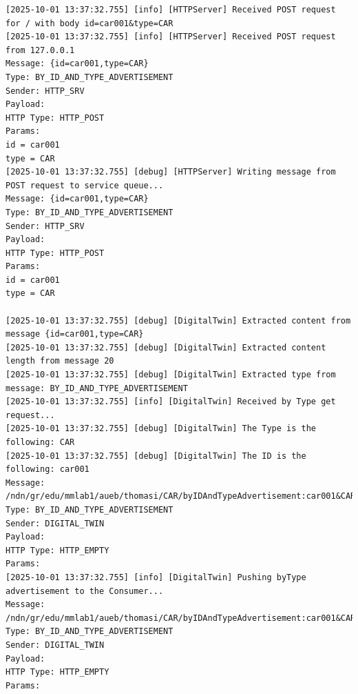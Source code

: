 \documentclass{article}
\begin{document}
\begin{lstlisting}[language=log, caption={Producer SeEDS Service logs after publishing \textit{@ids=car001,car002} to the \textit{@type=CAR} registry}, label={lst:publish-to-registry}]
[2025-10-01 13:37:32.755] [info] [HTTPServer] Received POST request for / with body id=car001&type=CAR
[2025-10-01 13:37:32.755] [info] [HTTPServer] Received POST request from 127.0.0.1
Message: {id=car001,type=CAR}
Type: BY_ID_AND_TYPE_ADVERTISEMENT
Sender: HTTP_SRV
Payload: 
HTTP Type: HTTP_POST
Params:
id = car001
type = CAR
[2025-10-01 13:37:32.755] [debug] [HTTPServer] Writing message from POST request to service queue...
Message: {id=car001,type=CAR}
Type: BY_ID_AND_TYPE_ADVERTISEMENT
Sender: HTTP_SRV
Payload: 
HTTP Type: HTTP_POST
Params:
id = car001
type = CAR

[2025-10-01 13:37:32.755] [debug] [DigitalTwin] Extracted content from message {id=car001,type=CAR}
[2025-10-01 13:37:32.755] [debug] [DigitalTwin] Extracted content length from message 20
[2025-10-01 13:37:32.755] [debug] [DigitalTwin] Extracted type from message: BY_ID_AND_TYPE_ADVERTISEMENT
[2025-10-01 13:37:32.755] [info] [DigitalTwin] Received by Type get request...
[2025-10-01 13:37:32.755] [debug] [DigitalTwin] The Type is the following: CAR
[2025-10-01 13:37:32.755] [debug] [DigitalTwin] The ID is the following: car001
Message: /ndn/gr/edu/mmlab1/aueb/thomasi/CAR/byIDAndTypeAdvertisement:car001&CAR
Type: BY_ID_AND_TYPE_ADVERTISEMENT
Sender: DIGITAL_TWIN
Payload: 
HTTP Type: HTTP_EMPTY
Params:
[2025-10-01 13:37:32.755] [info] [DigitalTwin] Pushing byType advertisement to the Consumer...
Message: /ndn/gr/edu/mmlab1/aueb/thomasi/CAR/byIDAndTypeAdvertisement:car001&CAR
Type: BY_ID_AND_TYPE_ADVERTISEMENT
Sender: DIGITAL_TWIN
Payload: 
HTTP Type: HTTP_EMPTY
Params:


\end{lstlisting}
\end{document}
